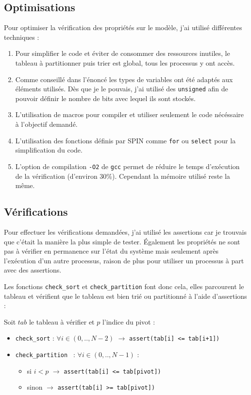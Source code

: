 \documentclass[french]{article}
\begin{document}
\subsection{Optimisations}
Pour optimiser la vérification des propriétés sur le modèle, j'ai utilisé différentes techniques :
\begin{enumerate}
    \item Pour simplifier le code et éviter de consommer des ressources inutiles, le tableau à
        partitionner puis trier est global, tous les processus y ont accès.

    \item Comme conseillé dans l'énoncé les types de variables ont été adaptés aux éléments
        utilisés. Dès que je le pouvais, j'ai utilisé des \verb:unsigned: afin de pouvoir définir
        le nombre de bits avec lequel ils sont stockés.

    \item L'utilisation de macros pour compiler et utiliser seulement le code nécéssaire à
        l'objectif demandé.

    \item L'utilisation des fonctions définis par SPIN comme \verb:for: ou \verb:select: pour la
        simplification du code.

    \item L'option de compilation \verb:-O2: de \verb:gcc: permet de réduire le temps d'exécution
        de la vérification (d'environ 30\%). Cependant la mémoire utilisé reste la même.
\end{enumerate}
\newpage

\subsection{Vérifications}
Pour effectuer les vérifications demandées, j'ai utilisé les assertions car je trouvais que
c'était la manière la plus simple de tester. Également les propriétés ne sont pas à vérifier en
permanence sur l'état du système mais seulement après l'exécution d'un autre processus, raison
de plus pour utiliser un processus à part avec des assertions.\newline

Les fonctions \verb:check_sort: et \verb:check_partition: font donc cela, elles parcourent le
tableau et vérifient que le tableau est bien trié ou partitionné à l'aide d'assertions :

Soit $tab$ le tableau à vérifier et $p$ l'indice du pivot :
\begin{itemize}
    \item \verb:check_sort: : $\forall i \in (0, ..,  N-2)$ $\rightarrow$ \verb:assert(tab[i] <= tab[i+1]):
    \item \verb:check_partition : : $\forall i \in (0, ..,  N-1)$ :
    \begin{itemize}
        \item si $i < p$ $\rightarrow$ \verb:assert(tab[i] <= tab[pivot]):
        \item sinon $\rightarrow$ \verb:assert(tab[i] >= tab[pivot]):
    \end{itemize}
\end{itemize}
\end{document}
